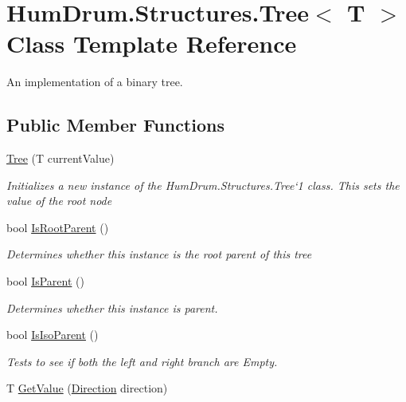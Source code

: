 \hypertarget{classHumDrum_1_1Structures_1_1Tree}{}\section{Hum\+Drum.\+Structures.\+Tree$<$ T $>$ Class Template Reference}
\label{classHumDrum_1_1Structures_1_1Tree}


An implementation of a binary tree.  


\subsection*{Public Member Functions}
\begin{DoxyCompactItemize}
\item 
\hyperlink{classHumDrum_1_1Structures_1_1Tree_a6e6ebd369e109f3c57ae55a2200d838b}{Tree} (T current\+Value)
\begin{DoxyCompactList}\small\item\em Initializes a new instance of the Hum\+Drum.\+Structures.\+Tree`1 class. This sets the value of the root node \end{DoxyCompactList}\item 
bool \hyperlink{classHumDrum_1_1Structures_1_1Tree_a38f16fff3eb7b4c4bcf40e93258bc963}{Is\+Root\+Parent} ()
\begin{DoxyCompactList}\small\item\em Determines whether this instance is the root parent of this tree \end{DoxyCompactList}\item 
bool \hyperlink{classHumDrum_1_1Structures_1_1Tree_a730fe13e25024e76315e82e5bfda87e9}{Is\+Parent} ()
\begin{DoxyCompactList}\small\item\em Determines whether this instance is parent. \end{DoxyCompactList}\item 
bool \hyperlink{classHumDrum_1_1Structures_1_1Tree_a7fcaecf94c6a74d09369807603ae89cb}{Is\+Iso\+Parent} ()
\begin{DoxyCompactList}\small\item\em Tests to see if both the left and right branch are Empty. \end{DoxyCompactList}\item 
T \hyperlink{classHumDrum_1_1Structures_1_1Tree_a9fc66ed4786f3ab58c1927e9dff6ddc1}{Get\+Value} (\hyperlink{namespaceHumDrum_1_1Structures_a83ca1f04475980cb7e79d471cc746dd3}{Direction} direction)

\end{DoxyCompactItemize}
